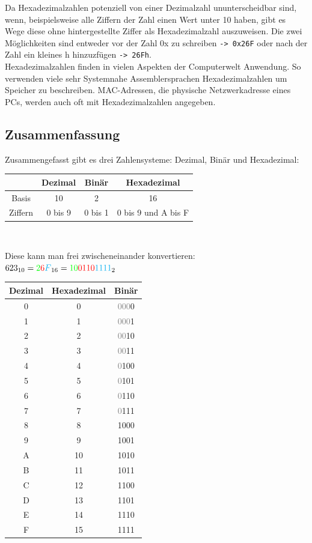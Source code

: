 \documentclass{article}
\begin{document}
	Da Hexadezimalzahlen potenziell von einer Dezimalzahl ununterscheidbar sind, wenn, beispielsweise alle Ziffern der Zahl einen Wert unter 10 haben, gibt es Wege diese ohne hintergestellte Ziffer als Hexadezimalzahl auszuweisen. Die zwei Möglichkeiten sind entweder vor der Zahl 0x zu schreiben \verb|-> 0x26F| oder nach der Zahl ein kleines h hinzuzfügen \verb|-> 26Fh|.\\
	Hexadezimalzahlen finden in vielen Aspekten der Computerwelt Anwendung. So verwenden viele sehr Systemnahe Assemblersprachen Hexadezimalzahlen um Speicher zu beschreiben. MAC-Adressen, die physische Netzwerkadresse eines PCs, werden auch oft mit Hexadezimalzahlen angegeben. \\
	\subsection{Zusammenfassung}
	Zusammengefasst gibt es drei Zahlensysteme: Dezimal, Binär und Hexadezimal: \\
	\begin{tabular}{| c | c | c | c |}
		\toprule
		&Dezimal & Binär & Hexadezimal \\ \midrule
		Basis & 10 & 2 & 16 \\ \hline
		Ziffern & 0 bis 9 & 0 bis 1 & 0 bis 9 und A bis F \\
		\bottomrule
	\end{tabular} \\
	\begin{multicols}{2}
	Diese kann man frei zwischeneinander konvertieren: \\
	$623_{10}=\textcolor{green}{2}\textcolor{red}{6}\textcolor{cyan}{F}_{16}=\textcolor{green}{10}\textcolor{red}{0110}\textcolor{cyan}{1111}_2$
	\vfill
	\columnbreak
	\begin{tabular}{| c | c | c |}
		\toprule
		Dezimal & Hexadezimal & Binär \\ \midrule
		0 & 0 & \textcolor{grey}{000}0 \\ \hline
		1 & 1 & \textcolor{grey}{000}1 \\ \hline
		2 & 2 & \textcolor{grey}{00}10 \\ \hline
		3 & 3 & \textcolor{grey}{00}11 \\ \hline
		4 & 4 & \textcolor{grey}{0}100 \\ \hline
		5 & 5 & \textcolor{grey}{0}101 \\ \hline
		6 & 6 & \textcolor{grey}{0}110 \\ \hline
		7 & 7 & \textcolor{grey}{0}111 \\ \hline
		8 & 8 & 1000 \\ \hline
		9 & 9 & 1001 \\ \hline
		A & 10 & 1010 \\ \hline
		B & 11 & 1011 \\ \hline
		C & 12 & 1100 \\ \hline
		D & 13 & 1101 \\ \hline
		E & 14 & 1110 \\ \hline
		F & 15 & 1111 \\
		\bottomrule
	\end{tabular}
	\end{multicols}
\end{document}

